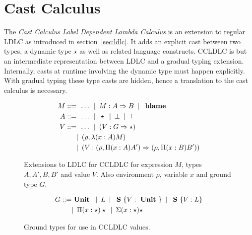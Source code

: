 \newcommand{\blame}{\text{ \textbf{blame} }}
\newcommand{\Single}{\text{ \textbf{S} }}

\chapter{Cast Calculus}\label{chap:cast-calculus}

The \emph{Cast Calculus Label Dependent Lambda Calculus} is an extension to regular LDLC as introduced in section~\ref{sec:ldlc}. It adds an explicit cast between two types, a dynamic type $\star$ as well as related language constructs. CCLDLC is but an intermediate representation between LDLC and a gradual typing extension. Internally, casts at runtime involving the dynamic type must happen explicitly. With gradual typing these type casts are hidden, hence a translation to the cast calculus is necessary.

\begin{figure}
\begin{align*}
 M ::= & \enspace \dots \enspace|\enspace
     M : A \Rightarrow B \enspace|\enspace \blame \\
 A ::= & \enspace \dots \enspace|\enspace
     \star \enspace|\enspace \bot \enspace|\enspace \top \\
 V ::= & \enspace \dots \enspace
        |\enspace (V : G \Rightarrow \star) \\
      & |\enspace (\rho, \lambda(x:A)M) \\
      & |\enspace (V : (\rho, \Pi(x:A) A') \Rightarrow (\rho, \Pi(x:B) B') )
\end{align*}
\caption{Extensions to LDLC for CCLDLC for expression $M$, types $A, A', B, B'$ and value $V$. Also environment $\rho$, variable $x$ and ground type $G$.}
\label{fig:ccldlc-extensions}
\end{figure}

\begin{figure}
\begin{align*}
 G ::= & \Unit \enspace|\enspace
    L \enspace|\enspace
    \Single\{V: \Unit\} \enspace|\enspace
    \Single\{V: L\} \\
    & |\enspace
    \Pi(x:\star)\star \enspace|\enspace
    \Sigma(x:\star)\star
\end{align*}
\caption{Ground types for use in CCLDLC values.}
\label{fig:ccldlc-ground-types}
\end{figure}
